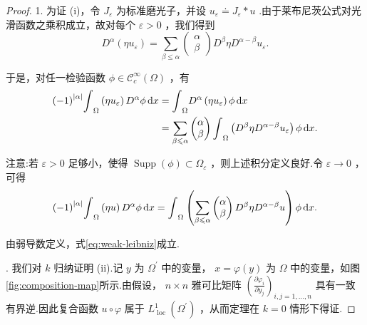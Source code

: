 \begin{proof}
1. 为证 (i)，令 ${J}_{\varepsilon }$ 为标准磨光子，并设 ${u}_{\varepsilon } \doteq  {J}_{\varepsilon } * u$ .由于莱布尼茨公式对光滑函数之乘积成立，故对每个 $\varepsilon  > 0$ ，我们得到
\begin{equation}\tag{8.19}\label{eq:weak-leibniz-mollified}
{D}^{\alpha }\left( {\eta {u}_{\varepsilon }}\right)  = \sum_{{\beta  \leq  \alpha }}\begin{pmatrix}\alpha\\ \beta \end{pmatrix} {D}^{\beta }\eta {D}^{\alpha  - \beta }{u}_{\varepsilon }.
\end{equation}

于是，对任一检验函数 $\phi  \in  {\mathcal{C}}_{c}^{\infty }\left( \Omega \right)$ ，有
{\begin{align*}
    {\left( -1\right) }^{\left| \alpha \right| }{\int }_{\Omega }\left( {\eta {u}_{\varepsilon }}\right) {D}^{\alpha }{\phi \mathop{}\!\mathrm{d} x} &= {\int }_{\Omega }{D}^{\alpha }\left( {\eta {u}_{\varepsilon }}\right) {\phi \mathop{}\!\mathrm{d} x} \\
    &= \sum_{{\beta  \leqslant  \alpha }}\begin{pmatrix}\alpha\\ \beta \end{pmatrix} {\int }_{\Omega }\left( {{D}^{\beta }\eta {D}^{\alpha  - \beta }{u}_{\varepsilon }}\right) {\phi \mathop{}\!\mathrm{d} x}.
\end{align*}}


注意:若 $\varepsilon  > 0$ 足够小，使得 $\operatorname{Supp}\left( \phi \right)  \subset  {\Omega }_{\varepsilon }$ ，则上述积分定义良好.令 $\varepsilon  \rightarrow  0$ ，可得
\[
{\left( -1\right) }^{\left| \alpha \right| }{\int }_{\Omega }\left( {\eta u}\right) {D}^{\alpha }{\phi \mathop{}\!\mathrm{d} x} = {\int }_{\Omega }\left( {\sum_{{\beta  \leqslant  \alpha }}\begin{pmatrix}\alpha\\ \beta \end{pmatrix} {D}^{\beta }\eta {D}^{\alpha  - \beta }u}\right) {\phi \mathop{}\!\mathrm{d} x}.
\]

由弱导数定义，式\eqref{eq:weak-leibniz}成立.

. 我们对 $k$ 归纳证明 (ii).记 $y$ 为 ${\Omega }^{\prime }$ 中的变量， $x = \varphi \left( y\right)$ 为 $\Omega$ 中的变量，如图\ref{fig:composition-map}所示.由假设， $n \times  n$ 雅可比矩阵 ${\left( \frac{\partial {\varphi }_{i}}{\partial {y}_{j}}\right) }_{i,j = 1,\ldots ,n}$ 具有一致有界逆.因此复合函数 $u \circ  \varphi$ 属于 ${L}_{\text{ loc }}^{1}\left( {\Omega }^{\prime }\right)$ ，从而定理在 $k = 0$ 情形下得证.


\end{proof}
